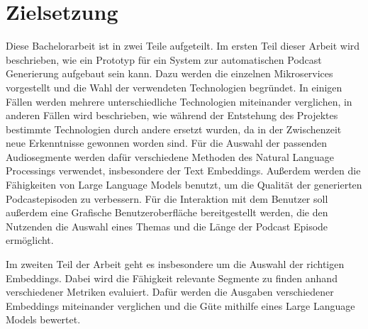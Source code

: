 







\section{Zielsetzung}

Diese Bachelorarbeit ist in zwei Teile aufgeteilt.
Im ersten Teil dieser Arbeit wird beschrieben, wie ein Prototyp für ein System zur automatischen Podcast Generierung aufgebaut sein kann.
Dazu werden die einzelnen Mikroservices vorgestellt und die Wahl der verwendeten Technologien begründet.
In einigen Fällen werden mehrere unterschiedliche Technologien miteinander verglichen, in anderen Fällen wird beschrieben, wie während der Entstehung des Projektes bestimmte Technologien durch andere ersetzt wurden, da in der Zwischenzeit neue Erkenntnisse gewonnen worden sind.
Für die Auswahl der passenden Audiosegmente werden dafür verschiedene Methoden des Natural Language Processings verwendet, insbesondere der Text Embeddings.
Außerdem werden die Fähigkeiten von Large Language Models benutzt, um die Qualität der generierten Podcastepisoden zu verbessern.
Für die Interaktion mit dem Benutzer soll außerdem eine Grafische Benutzeroberfläche bereitgestellt werden, die den Nutzenden die Auswahl eines Themas und die Länge der Podcast Episode ermöglicht.

Im zweiten Teil der Arbeit geht es insbesondere um die Auswahl der richtigen Embeddings.
Dabei wird die Fähigkeit relevante Segmente zu finden anhand verschiedener Metriken evaluiert.
Dafür werden die Ausgaben verschiedener Embeddings miteinander verglichen und die Güte mithilfe eines Large Language Models bewertet.


